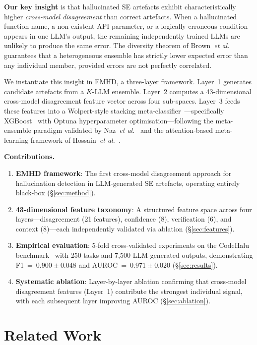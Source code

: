 \documentclass[11pt,a4paper]{article}
\newcommand{\method}{\textsc{EMHD}}
\newcommand{\etal}{\textit{et al.}}
\begin{document}
\textbf{Our key insight} is that hallucinated SE artefacts exhibit characteristically higher \emph{cross-model disagreement} than correct artefacts. When a hallucinated function name, a non-existent API parameter, or a logically erroneous condition appears in one LLM's output, the remaining independently trained LLMs are unlikely to produce the same error. The diversity theorem of Brown~\etal~\cite{brown2005diversity} guarantees that a heterogeneous ensemble has strictly lower expected error than any individual member, provided errors are not perfectly correlated.

We instantiate this insight in \method{}, a three-layer framework. Layer~1 generates candidate artefacts from a $K$-LLM ensemble. Layer~2 computes a 43-dimensional cross-model disagreement feature vector across four sub-spaces. Layer~3 feeds these features into a Wolpert-style stacking meta-classifier~\cite{wolpert1992stacking}---specifically XGBoost~\cite{chen2016xgboost} with Optuna hyperparameter optimisation---following the meta-ensemble paradigm validated by Naz~\etal~\cite{naz2025metaensemble} and the attention-based meta-learning framework of Hossain~\etal~\cite{hossain2025attention}.

\medskip
\noindent\textbf{Contributions.}
\begin{enumerate}
\item \textbf{EMHD framework}: The first cross-model disagreement approach for hallucination detection in LLM-generated SE artefacts, operating entirely black-box (\S\ref{sec:method}).
\item \textbf{43-dimensional feature taxonomy}: A structured feature space across four layers---disagreement (21 features), confidence (8), verification (6), and context (8)---each independently validated via ablation (\S\ref{sec:features}).
\item \textbf{Empirical evaluation}: 5-fold cross-validated experiments on the CodeHalu benchmark~\cite{tian2025codehalu} with 250 tasks and 7,500 LLM-generated outputs, demonstrating F1~=~$0.900 \pm 0.048$ and AUROC~=~$0.971 \pm 0.020$ (\S\ref{sec:results}).
\item \textbf{Systematic ablation}: Layer-by-layer ablation confirming that cross-model disagreement features (Layer~1) contribute the strongest individual signal, with each subsequent layer improving AUROC (\S\ref{sec:ablation}).
\end{enumerate}


\section{Related Work}
\label{sec:related}
\end{document}
